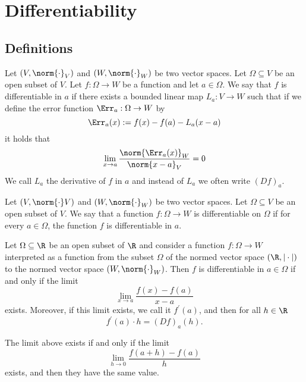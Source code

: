 \section{Differentiability}

\subsection{Definitions}

\begin{definition}
    Let $(V,\norm{\cdot}_V)$ and $(W,\norm{\cdot}_W)$ be two vector spaces. Let
    $\Omega \subseteq V$ be an open subset of $V$. Let $f:\Omega \to W$ be a
    function and let $a \in \Omega$. We say that $f$ is differentiable in $a$
    if there exists a bounded linear map $L_a:V \to W$ such that if we define
    the error function $\Err_a:\Omega \to W$ by $$\Err_a(x) := f(x) - f(a) -
    L_a(x-a)$$ it holds that $$\lim_{x\to a}
    \frac{\norm{\Err_a(x)}_W}{\norm{x-a}_V} = 0$$ We call $L_a$ the derivative
    of $f$ in $a$ and instead of $L_a$ we often write $(Df)_a$.
\end{definition}

\begin{definition}
    Let $(V,\norm{\cdot}V)$ and $(W,\norm{\cdot}_W)$ be two vector spaces. Let
    $\Omega \subseteq V$ be an open subset of $V$. We say that a function $f:
    \Omega \to W$ is differentiable on $\Omega$ if for every $a \in \Omega$,
    the function $f$ is differentiable in $a$.
\end{definition}

\begin{proposition}
    Let $\Omega \subseteq \R$ be an open subset of $\R$ and consider a function
    $f:\Omega \to W$ interpreted as a function from the subset $\Omega$ of the
    normed vector space $(\R,|\cdot|)$ to the normed vector space
    $(W,\norm{\cdot}_W)$. Then $f$ is differentiable in $a \in \Omega$ if and
    only if the limit 
    $$\lim_{x \to a} \frac{f(x)-f(a)}{x-a}$$ 
    exists. Moreover, if this limit exists, we call it $f^\prime(a)$, and then
    for all $h \in \R$
    $$f^\prime(a)\cdot h = (Df)_a(h).$$
\end{proposition}
\begin{remark}
    The limit above exists if and only if the limit
    $$\lim_{h \to 0} \frac{f(a+h)-f(a)}{h}$$
    exists, and then they have the same value.
\end{remark}

